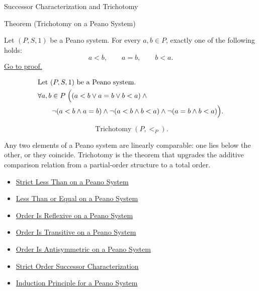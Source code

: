 \begin{topicbox}{Successor Characterization and Trichotomy}
\begin{theorembox}{Theorem (Trichotomy on a Peano System)}
\begin{theorem}
\label{thm:trichotomy-on-peano-system}
Let $(P,S,1)$ be a Peano system. For every $a,b \in P$, exactly one of the
following holds:
\[
a<b,\qquad a=b,\qquad b<a.
\]
\hyperref[prf:trichotomy-on-peano-system]{Go to proof.}
\end{theorem}
\end{theorembox}

\begin{remark*}
\[
\begin{aligned}
&\text{Let } (P,S,1) \text{ be a Peano system.}\\
&\forall a,b \in P\;
\Bigl(
(a<b \lor a=b \lor b<a) \land {}\\
&\qquad\neg(a<b \land a=b) \land
\neg(a<b \land b<a) \land
\neg(a=b \land b<a)
\Bigr).
\end{aligned}
\]
\end{remark*}

\begin{remark*}
\[
\operatorname{Trichotomy}(P,<_{P}).
\]
\end{remark*}

\begin{remark*}[Interpretation]
Any two elements of a Peano system are linearly comparable: one lies below the
other, or they coincide. Trichotomy is the theorem that upgrades the additive
comparison relation from a partial-order structure to a total order.
\end{remark*}

\begin{dependencies}
\begin{itemize}
  \item \hyperref[def:strict-less-than-on-peano-system]{Strict Less Than on a Peano System}
  \item \hyperref[def:less-than-or-equal-on-peano-system]{Less Than or Equal on a Peano System}
  \item \hyperref[thm:order-reflexive-on-peano-system]{Order Is Reflexive on a Peano System}
  \item \hyperref[thm:order-transitive-on-peano-system]{Order Is Transitive on a Peano System}
  \item \hyperref[thm:order-antisymmetric-on-peano-system]{Order Is Antisymmetric on a Peano System}
  \item \hyperref[thm:strict-order-successor-characterization]{Strict Order Successor Characterization}
  \item \hyperref[thm:induction-principle-for-peano-system]{Induction Principle for a Peano System}
\end{itemize}
\end{dependencies}


\end{topicbox}
